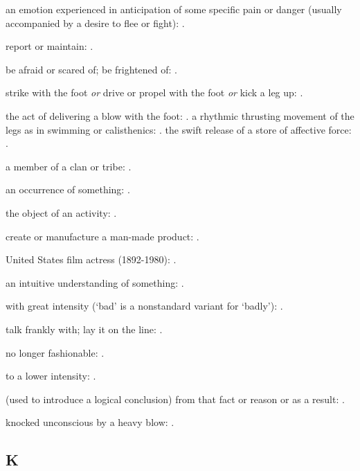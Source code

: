   an emotion experienced in anticipation of some specific pain or danger (usually accompanied by a desire to flee or fight):   .

  report or maintain:   .

  be afraid or scared of; be frightened of:   .

  strike with the foot \textit{or} drive or propel with the foot \textit{or} kick a leg up: .

  the act of delivering a blow with the foot:   . a rhythmic thrusting movement of the legs as in swimming or calisthenics:   . the swift release of a store of affective force:   .

  a member of a clan or tribe: .

  an occurrence of something:   .

  the object of an activity: .

  create or manufacture a man-made product:   .

  United States film actress (1892-1980):   .

  an intuitive understanding of something: .

  with great intensity (`bad' is a nonstandard variant for `badly'):   .

  talk frankly with; lay it on the line: .

  no longer fashionable: .

  to a lower intensity: .

  (used to introduce a logical conclusion) from that fact or reason or as a result:   .

  knocked unconscious by a heavy blow:   .

\subsection*{K}

